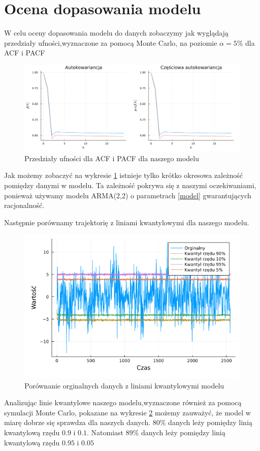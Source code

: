 \documentclass[12pt]{article}
\begin{document}
	
	
	\vspace{-3mm}\section{Ocena dopasowania modelu}
	W celu oceny dopasowania modelu do danych zobaczymy jak wyglądają przedziały ufności,wyznaczone za pomocą Monte Carlo, na poziomie $\alpha = 5\%$ dla ACF i PACF 
	\begin{figure}[H]
		\centering
		\includegraphics[width=\columnwidth]{img/acf_pacf.png}
		\caption{Przedziały ufności dla ACF i PACF dla naszego modelu}
		\label{fig:model_acf_pacf}
	\end{figure}
	Jak możemy zobaczyć na wykresie \ref{fig:model_acf_pacf} istnieje tylko krótko okresowa zależność pomiędzy danymi w modelu. Ta zależność pokrywa się z naszymi oczekiwaniami, ponieważ używamy modelu ARMA(2,2) o parametrach \ref{model} gwarantujących racjonalność. 
	
	
	Następnie porównamy trajektorię z liniami kwantylowymi dla naszego modelu.
	\begin{figure}[H]
		\centering
		\includegraphics[width=3\columnwidth/4]{img/linie_kwantylowe.png}
		\caption{Porównanie orginalnych danych z liniami kwantylowymi modelu}
		\label{fig:linie_kwantylowe}
	\end{figure}
Analizując linie kwantylowe naszego modelu,wyznaczone również  za pomocą symulacji Monte Carlo, pokazane na wykresie \ref{fig:linie_kwantylowe} możemy zauważyć, że model w miarę dobrze się sprawdza dla naszych danych. $80\%$ danych leży pomiędzy linią kwantylową rzędu $0.9$ i $0.1$. Natomiast $89\%$  danych leży pomiędzy linią kwantylową rzędu $0.95$ i $0.05$
\end{document}
